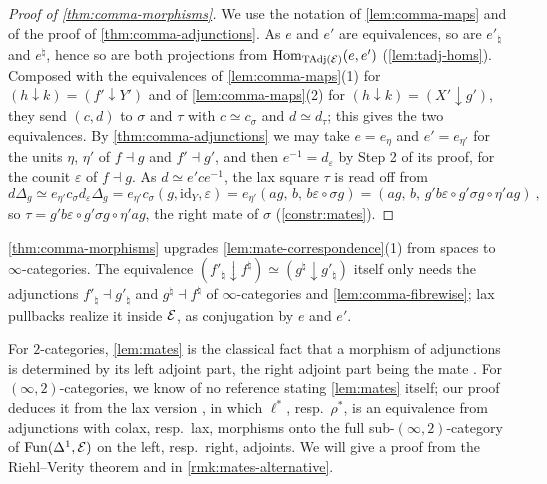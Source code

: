 \begin{proof}[Proof of \cref{thm:comma-morphisms}]
%
We use the notation of \cref{lem:comma-maps} and of the proof of
\cref{thm:comma-adjunctions}.
As $e$ and $e'$ are equivalences,
so are $e'_{\natural}$ and $e^{\natural}$, hence so are both projections from
$\operatorname{Hom}_{\mathrm{TAdj}(\mathcal{E})}(e,e')$
(\cref{lem:tadj-homs}).
Composed with the equivalences of \cref{lem:comma-maps}(1) for
$(h \downarrow k) = (f' \downarrow Y')$
and of \cref{lem:comma-maps}(2) for
$(h \downarrow k) = (X' \downarrow g')$,
they send $(c,d)$ to $\sigma$ and $\tau$ with $c \simeq c_{\sigma}$ and $d
\simeq d_{\tau}$; this gives the two equivalences.
By \cref{thm:comma-adjunctions} we may take $e = e_{\eta}$ and $e' = e_{\eta'}$
for the units $\eta$, $\eta'$ of $f \dashv g$ and $f' \dashv g'$, and then
$e^{-1} = d_{\varepsilon}$
by Step 2 of its proof, for the counit $\varepsilon$ of $f \dashv g$.
As $d \simeq e'ce^{-1}$,
the lax square $\tau$ is read off from
\begin{equation*}
d\Delta_{g} \simeq e_{\eta'}c_{\sigma}d_{\varepsilon}\Delta_{g} =
e_{\eta'}c_{\sigma}(g,\mathrm{id}_{Y},\varepsilon) =
e_{\eta'}(ag,\,b,\,b\varepsilon \circ \sigma g) = (ag,\,b,\,g'b\varepsilon \circ
g'\sigma g \circ \eta'ag) \ ,
\end{equation*}
so
$\tau = g'b\varepsilon \circ g'\sigma g \circ \eta'ag$,
the right mate of $\sigma$ (\cref{constr:mates}).
\end{proof}

\begin{rmk}
\label{rmk:comma-morphisms}
%
\cref{thm:comma-morphisms} upgrades \cref{lem:mate-correspondence}(1) from
spaces to $\infty$-categories. The equivalence
$(f'_{\natural} \downarrow f^{\natural}) \simeq (g^{\natural} \downarrow
g'_{\natural})$
itself only needs the adjunctions
$f'_{\natural} \dashv g'_{\natural}$
and
$g^{\natural} \dashv f^{\natural}$
of $\infty$-categories and \cref{lem:comma-fibrewise};
lax pullbacks realize it inside $\mathcal{E}$, as conjugation by $e$ and $e'$.
\end{rmk}

\begin{rmk}
\label{rmk:mates-2cat}
%
For $2$-categories, \cref{lem:mates} is the classical fact that a morphism of
adjunctions is determined by its left adjoint part,
the right adjoint part being the mate \cite{kellystreet1974review}.
For $(\infty,2)$-categories, we know of no reference stating \cref{lem:mates}
itself; our proof deduces it from the lax version
\cite[Cor.~4.8]{haugseng2021laxmonads}, in which $\ell^{*}$, resp.\ $\rho^{*}$,
is an equivalence from adjunctions with colax, resp.\ lax,
morphisms onto the full sub-$(\infty,2)$-category of $\operatorname{Fun}(\Delta^{1},\mathcal{E})$ on
the left, resp.\ right, adjoints. We will give a proof from the Riehl--Verity
theorem and \cite[Cor.~5.2.12]{abellangagnahaugseng2024straightening} in
\cref{rmk:mates-alternative}.
\end{rmk}

